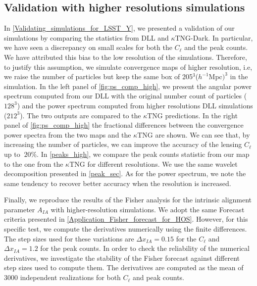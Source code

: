 \documentclass{aa}
\begin{document}
\begin{appendix}
\section{Validation with higher resolutions simulations}
In \autoref{Validating_simulations_for_LSST_Y}, we presented a validation of our simulations by comparing the statistics from DLL and $\kappa$TNG-Dark.
In particular, we have seen a discrepancy on small scales for both the $C_{\ell}$ and the peak counts. We have attributed this bias to the low resolution of the simulations. Therefore, to justify this assumption, we simulate convergence maps of higher resolution, i.e, we raise the number of particles but keep the same box of 205$^3$($h^{-1}$Mpc$)^3$ in the simulation. In the left panel of  \autoref{fig:ps_comp_high}, we present the angular power spectrum computed from our DLL with the original number count of particles ($128^3$) and the power spectrum computed from higher resolutions DLL simulations ($212^3$). The two outputs are compared to the $\kappa$TNG predictions. In the right panel  of \autoref{fig:ps_comp_high} the fractional differences between the convergence power spectra from the two maps and the $\kappa$TNG are shown. We can see that, by increasing the number of particles, we can improve the accuracy of the lensing $C_{\ell}$ up to $~20\%$.
In \autoref{peaks_high}, we compare the peak counts statistic from our map to the one from the $\kappa$TNG for different resolutions. We use the same wavelet decomposition presented in \autoref{peak_sec}. As for the power spectrum, we note the same tendency to recover better accuracy when the resolution is increased. 

Finally, we reproduce the results of the Fisher analysis for the intrinsic alignment parameter $A_{IA}$ with higher-resolution simulations. We adopt the same Forecast criteria presented in \autoref{Application_Fisher_forecast_for_HOS}. However, for this specific test, we compute the derivatives numerically using the finite differences. The step sizes used for these variations are $\Delta x_{IA}=0.15$ for the $C_{\ell}$ and $\Delta x_{IA}=1.2$ for the peak counts. 
In order to check the reliability of the numerical derivatives, we investigate the stability of the Fisher forecast against different step sizes used to compute them.
The derivatives are computed as the mean of 3000 independent realizations for both $C_{\ell}$ and peak counts. 


\end{appendix}
\end{document}
